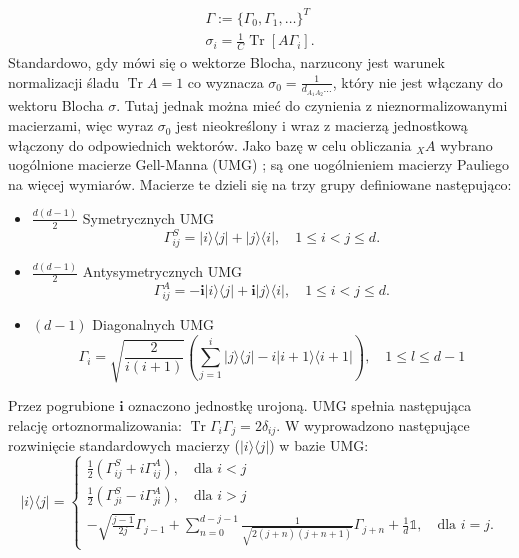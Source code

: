 \documentclass[10pt]{article} %
\DeclareMathOperator{\Trs}{Tr}
\newcommand{\Ket}[1]{|#1\rangle}
\newcommand{\Bra}[1]{\langle#1|}
\newcommand{\I}{\mathbb{1}}
\begin{document}
\begin{appendices}
\begin{gather}
\Gamma := \{ \Gamma_0, \Gamma_1, \dots \}^T \\
\sigma_i = \frac{1}{C} \Trs \left[ A \Gamma_i \right].
\end{gather} Standardowo, gdy mówi się o wektorze Blocha, narzucony jest warunek normalizacji śladu $\Trs A = 1$ co wyznacza $\sigma_0 = \frac{1}{d_{A_1A_2} \dots}$, który nie jest włączany do wektoru Blocha $\mathbb{\sigma}$. Tutaj jednak można mieć do czynienia z nieznormalizowanymi macierzami, więc
wyraz $\sigma_0$ jest nieokreślony i wraz z macierzą jednostkową włączony do odpowiednich wektorów. Jako bazę w celu obliczania ${}_XA$ wybrano uogólnione macierze Gell-Manna (UMG) \cite{gell_mann}; są one uogólnieniem macierzy Pauliego na więcej wymiarów. Macierze te dzieli się na trzy grupy definiowane następująco:
\begin{itemize}
\item{$\frac{d(d-1)}{2}$ Symetrycznych UMG}
\begin{equation}
\Gamma_{ij}^S = \Ket{i}\Bra{j} + \Ket{j}\Bra{i}, \quad 1 \leq i < j \leq d.
\end{equation}
\item{$\frac{d(d-1)}{2}$ Antysymetrycznych UMG}
\begin{equation}
\Gamma_{ij}^A = -\mathbf{i}\Ket{i}\Bra{j} + \mathbf{i}\Ket{j}\Bra{i}, \quad 1 \leq i < j \leq d.
\end{equation} 
\item{$(d-1)$ Diagonalnych UMG}
\begin{equation}
\Gamma_{i} = \sqrt{\frac{2}{i(i+1)}} \left( \sum_{j=1}^{i } \Ket{j}\Bra{j} - i\Ket{i+1}\Bra{i+1}\right), \quad 1 \leq l \leq d-1
\end{equation}
\end{itemize}
Przez pogrubione $\mathbf{i}$ oznaczono jednostkę urojoną.
UMG spełnia następująca relację ortoznormalizowania: $\Trs \Gamma_i \Gamma_j = 2\delta_{ij}$.
W \cite{gell_mann} wyprowadzono następujące rozwinięcie standardowych macierzy ($\Ket{i}\Bra{j}$) w bazie UMG:
\begin{equation}
\label{gm_ij}
\Ket{i}\Bra{j} =
\begin{cases}
\frac{1}{2} \left(\Gamma_{ij}^S + i \Gamma_{ij}^A\right), \quad \text{dla } i < j \\
\frac{1}{2} \left(\Gamma_{ji}^S - i \Gamma_{ji}^A\right), \quad \text{dla } i > j \\
- \sqrt{\frac{j-1}{2j}} \Gamma_{j-1}  + \sum_{n=0}^{d-j-1} \frac{1}{\sqrt{2(j+n)(j+n+1)}} \Gamma_{j+n} + \frac{1}{d}\I, \quad \text{dla } i=j.

\end{cases}
\end{equation}
\end{appendices}
\end{document}
